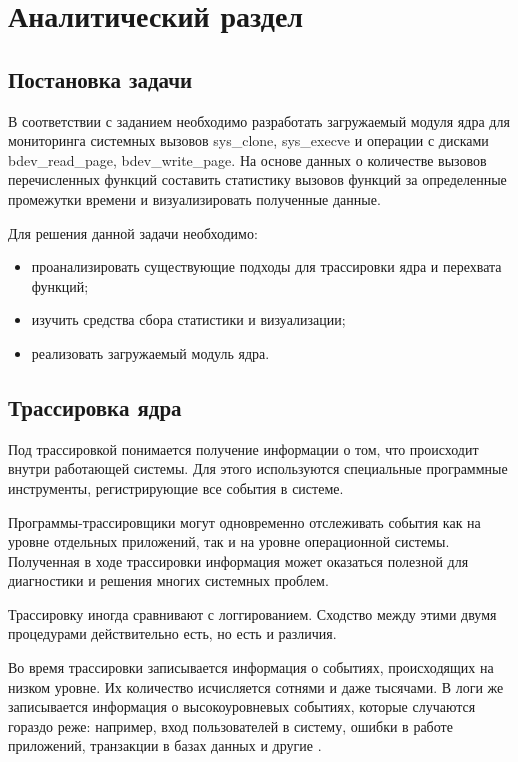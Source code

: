 \chapter{Аналитический раздел}

\section{Постановка задачи}

В соответствии с заданием необходимо разработать загружаемый модуля ядра для мониторинга системных вызовов sys\_clone, sys\_execve и операции с дисками bdev\_read\_page, bdev\_write\_page. На основе данных о количестве вызовов перечисленных функций составить статистику вызовов функций за определенные промежутки времени и визуализировать полученные данные.

Для решения данной задачи необходимо:

\begin{itemize}
	\item проанализировать существующие подходы для трассировки ядра и перехвата функций;
	\item изучить средства сбора статистики и визуализации;
	\item реализовать загружаемый модуль ядра.
\end{itemize}

\section{Трассировка ядра}

Под трассировкой понимается получение информации о том, что происходит внутри работающей системы. Для этого используются специальные программные инструменты, регистрирующие все события в системе.
 
Программы-трассировщики могут одновременно отслеживать события как на уровне отдельных приложений, так и на уровне операционной системы. Полученная в ходе трассировки информация может оказаться полезной для диагностики и решения многих системных проблем.

Трассировку иногда сравнивают с логгированием. Сходство между этими двумя процедурами действительно есть, но есть и различия.

Во время трассировки записывается информация о событиях, происходящих на низком уровне. Их количество исчисляется сотнями и даже тысячами. В логи же записывается информация о высокоуровневых событиях, которые случаются гораздо реже: например, вход пользователей в систему, ошибки в работе приложений, транзакции в базах данных и другие \cite{tras_sys_calls}.


